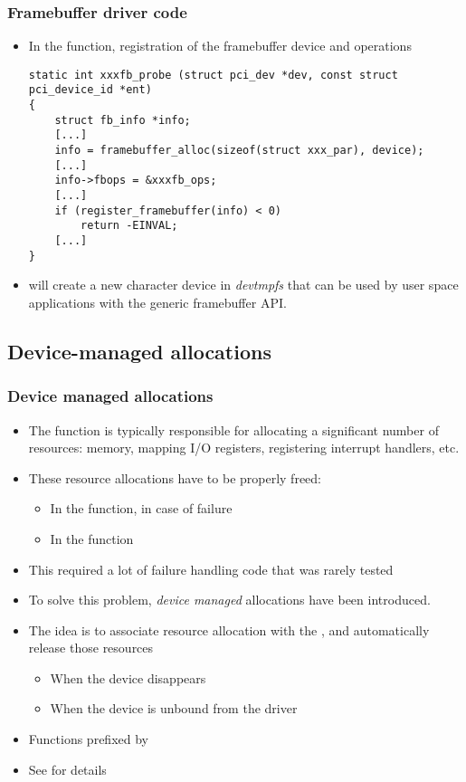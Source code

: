 \begin{frame}[fragile]
  \frametitle{Framebuffer driver code}
  \begin{itemize}
  \item In the  function, registration of the
    framebuffer device and operations
  \begin{verbatim}
static int xxxfb_probe (struct pci_dev *dev, const struct pci_device_id *ent)
{
    struct fb_info *info;
    [...]
    info = framebuffer_alloc(sizeof(struct xxx_par), device);
    [...]
    info->fbops = &xxxfb_ops;
    [...]
    if (register_framebuffer(info) < 0)
        return -EINVAL;
    [...]
}
  \end{verbatim}
  \item {} will create a new character device
    in {\em devtmpfs} that can be used by user space applications
    with the generic framebuffer API.
\end{itemize}
\end{frame}

\subsection{Device-managed allocations}

\begin{frame}
  \frametitle{Device managed allocations}
  \begin{itemize}
  \item The  function is typically responsible for
    allocating a significant number of resources: memory, mapping I/O
    registers, registering interrupt handlers, etc.
  \item These resource allocations have to be properly freed:
    \begin{itemize}
    \item In the  function, in case of failure
    \item In the  function
    \end{itemize}
  \item This required a lot of failure handling code that was rarely
    tested
  \item To solve this problem, {\em device managed} allocations have
    been introduced.
  \item The idea is to associate resource allocation with the
    , and automatically release those resources
    \begin{itemize}
    \item When the device disappears
    \item When the device is unbound from the driver
    \end{itemize}
  \item Functions prefixed by 
  \item See  for details
  \end{itemize}
\end{frame}

